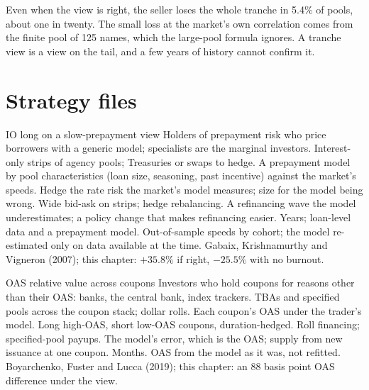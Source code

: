 Even when the view is right, the seller loses the whole tranche in 5.4\% of pools, about one in twenty. The small loss at the market's own correlation comes from the finite
pool of 125 names, which the large-pool formula ignores. A tranche view is a view on the tail, and a few years of history cannot confirm it.

\section{Strategy files}

\begin{strategyfile}{IO long on a slow-prepayment view}\label{strat:s2:mortgage-and-structured-credit-strategies:io}
 Holders of prepayment risk who price borrowers with a generic model; specialists are the marginal investors.
 Interest-only strips of agency pools; Treasuries or swaps to hedge.
 A prepayment model by pool characteristics (loan size, seasoning, past incentive) against the market's speeds.
 Hedge the rate risk the market's model measures; size for the model being wrong.
 Wide bid-ask on strips; hedge rebalancing.
 A refinancing wave the model underestimates; a policy change that makes refinancing easier.
 Years; loan-level data and a prepayment model.
 Out-of-sample speeds by cohort; the model re-estimated only on data available at the time.
 Gabaix, Krishnamurthy and Vigneron (2007); this chapter: $+35.8\%$ if right, $-25.5\%$ with no burnout.
\end{strategyfile}

\begin{strategyfile}{OAS relative value across coupons}\label{strat:s2:mortgage-and-structured-credit-strategies:oas}
 Investors who hold coupons for reasons other than their OAS: banks, the central bank, index trackers.
 TBAs and specified pools across the coupon stack; dollar rolls.
 Each coupon's OAS under the trader's model.
 Long high-OAS, short low-OAS coupons, duration-hedged.
 Roll financing; specified-pool payups.
 The model's error, which is the OAS; supply from new issuance at one coupon.
 Months.
 OAS from the model as it was, not refitted.
 Boyarchenko, Fuster and Lucca (2019); this chapter: an 88 basis point OAS difference under the view.
\end{strategyfile}

